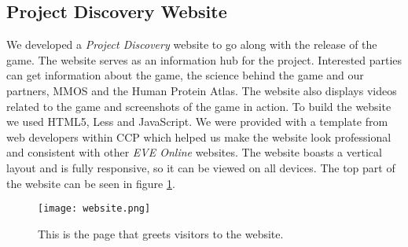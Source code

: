 \subsection{Project Discovery Website}
We developed a \emph{Project Discovery} website to go along with the release of the game. The website serves as an information hub for the project. Interested parties can get information about the game, the science behind the game and our partners, MMOS and the Human Protein Atlas. The website also displays videos related to the game and screenshots of the game in action. To build the website we used HTML5, Less and JavaScript. We were provided with a template from web developers within CCP which helped us make the website look professional and consistent with other \emph{EVE Online} websites. The website boasts a vertical layout and is fully responsive, so it can be viewed on all devices. The top part of the website can be seen in figure \ref{fig:website}.

\begin{figure}[H]
\centering
\graphicspath{ {./graphics/} }
\centerline{\texttt{[image: website.png]}}
\caption{\label{fig:website} This is the page that greets visitors to the website.}
\end{figure}
